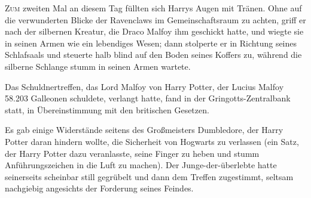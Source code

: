 

\lettrine{Z}{um} zweiten Mal an diesem Tag füllten sich Harrys Augen mit Tränen. Ohne auf die verwunderten Blicke der Ravenclaws im Gemeinschaftsraum zu achten, griff er nach der silbernen Kreatur, die Draco Malfoy ihm geschickt hatte, und wiegte sie in seinen Armen wie ein lebendiges Wesen; dann stolperte er in Richtung seines Schlafsaals und steuerte halb blind auf den Boden seines Koffers zu, während die silberne Schlange stumm in seinen Armen wartete.


Das Schuldnertreffen, das Lord Malfoy von Harry Potter, der Lucius Malfoy 58.203 Galleonen schuldete, verlangt hatte, fand in der Gringotts-Zentralbank statt, in Übereinstimmung mit den britischen Gesetzen.

Es gab einige Widerstände seitens des Großmeisters Dumbledore, der Harry Potter daran hindern wollte, die Sicherheit von Hogwarts zu verlassen (ein Satz, der Harry Potter dazu veranlasste, seine Finger zu heben und stumm Anführungszeichen in die Luft zu machen). Der Junge-der-überlebte hatte seinerseits scheinbar still gegrübelt und dann dem Treffen zugestimmt, seltsam nachgiebig angesichts der Forderung seines Feindes.

